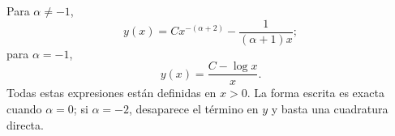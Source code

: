 Para \(\alpha\ne-1\),
\[
y(x)=C x^{-(\alpha+2)}-\frac{1}{(\alpha+1)x};
\]
para \(\alpha=-1\),
\[
y(x)=\frac{C-\log x}{x}.
\]
Todas estas expresiones están definidas en \(x>0\). La forma escrita es exacta cuando \(\alpha=0\); si \(\alpha=-2\), desaparece el término en \(y\) y basta una cuadratura directa.
